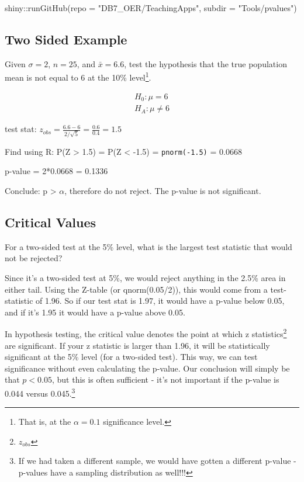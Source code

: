 \documentclass[
  letterpaper,
  DIV=11,
  numbers=noendperiod,
  oneside]{scrreprt}
\newenvironment{Shaded}{\begin{snugshade}}{\end{snugshade}}
\newcommand{\AttributeTok}[1]{\textcolor[rgb]{0.40,0.45,0.13}{#1}}
\newcommand{\FunctionTok}[1]{\textcolor[rgb]{0.28,0.35,0.67}{#1}}
\newcommand{\NormalTok}[1]{\textcolor[rgb]{0.00,0.23,0.31}{#1}}
\newcommand{\SpecialCharTok}[1]{\textcolor[rgb]{0.37,0.37,0.37}{#1}}
\newcommand{\StringTok}[1]{\textcolor[rgb]{0.13,0.47,0.30}{#1}}
\begin{document}
\begin{Shaded}
\begin{Highlighting}[]
\NormalTok{shiny}\SpecialCharTok{::}\FunctionTok{runGitHub}\NormalTok{(}\AttributeTok{repo =} \StringTok{"DB7\_OER/TeachingApps"}\NormalTok{, }
    \AttributeTok{subdir =} \StringTok{"Tools/pvalues"}\NormalTok{)}
\end{Highlighting}
\end{Shaded}

\hypertarget{two-sided-example}{%
\subsection{Two Sided Example}\label{two-sided-example}}

Given \(\sigma = 2\), \(n = 25\), and \(\bar x = 6.6\), test the
hypothesis that the true population mean is not equal to 6 at the 10\%
level\footnote{That is, at the \(\alpha=0.1\) significance level.}.\vspace{-4mm}

\begin{align*}
H_0: \mu = 6\\
H_A: \mu \ne 6
\end{align*}

test stat:
\(z_{obs} = \frac{6.6 - 6}{2/\sqrt{5}} = \frac{0.6}{0.4} = 1.5\)

Find using R: P(Z \textgreater{} 1.5) = P(Z \textless{} -1.5) =
\texttt{pnorm(-1.5)} = 0.0668

p-value = 2*0.0668 = 0.1336

Conclude: p \textgreater{} \(\alpha\), therefore do not reject. The
p-value is not significant.

\hypertarget{critical-values-1}{%
\subsection{Critical Values}\label{critical-values-1}}

For a two-sided test at the 5\% level, what is the largest test
statistic that would not be rejected?

Since it's a two-sided test at 5\%, we would reject anything in the
2.5\% area in either tail. Using the Z-table (or qnorm(0.05/2)), this
would come from a test-statistic of 1.96. So if our test stat is 1.97,
it would have a p-value below 0.05, and if it's 1.95 it would have a
p-value above 0.05.

In hypothesis testing, the critical value denotes the point at which z
statistics\footnote{\(z_{obs}\)} are significant. If your z statistic is
larger than 1.96, it will be statistically significant at the 5\% level
(for a two-sided test). This way, we can test significance without even
calculating the p-value. Our conclusion will simply be that \(p<0.05\),
but this is often sufficient - it's not important if the p-value is
0.044 versus 0.045.\footnote{If we had taken a different sample, we
  would have gotten a different p-value - p-values have a sampling
  distribution as well!!!}
\end{document}
